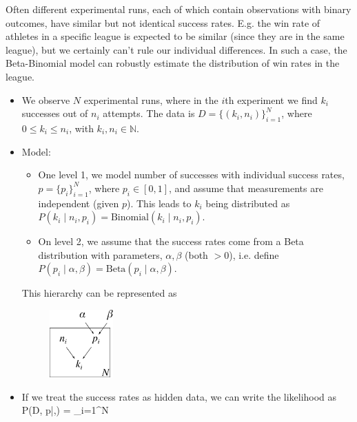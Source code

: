 Often different experimental runs, each of which contain observations with binary outcomes, have similar but not identical success rates. E.g. the win rate of athletes in a specific league is expected to be similar (since they are in the same league), but we certainly can't rule our individual differences. In such a case, the Beta-Binomial model can robustly estimate the distribution of win rates in the league.
\begin{itemize}
	\item We observe $N$ experimental runs, where in the $i$th experiment we find  $k_i$ successes out of $n_i$ attempts. The data is $D = \{(k_i, n_i)\}_{i=1}^N$, where $0 \leq k_i\leq n_i$, with $k_i, n_i \in \mathds{N}$.

	\item Model: 
		\begin{itemize}
			\item One level 1, we model number of successes with individual success rates, $p = \{p_i\}_{i=1}^N$, where $p_i \in [0,1]$, and assume that measurements are independent (given $p$). This leads to $k_i$ being  distributed as $P(k_i\;|\;n_i, p_i) = \text{Binomial}(k_i\;|\;n_i, p_i)$.
			\item On level 2, we assume that the success rates come from a Beta distribution with parameters, $\alpha, \beta$ (both $>0$), i.e. define $P(p_i\;|\;\alpha, \beta) = \text{Beta}(p_i\;|\;\alpha, \beta)$.
		\end{itemize}
		This hierarchy can be represented as
		\begin{figure}[h!]
		\centering
			\includegraphics[height=26mm]{./figs/04-BetaBinomial.pdf}
		\end{figure}

	\item If we treat the success rates as hidden data, we can write the likelihood as
	\be
		P(D, p\;|\;\alpha,\beta) = \prod_{i=1}^N
	\ee


\end{itemize}
